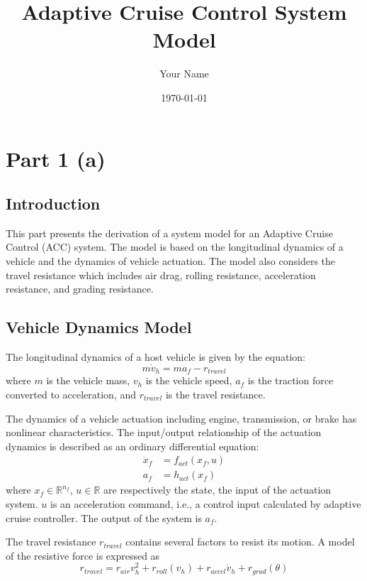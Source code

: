 \documentclass[12pt]{report}
\title{Adaptive Cruise Control System Model}
\author{Your Name}
\date{\today}
\begin{document}
\maketitle
\setcounter{tocdepth}{3}
\tableofcontents


\chapter{Part 1 (a)}
\section{Introduction}
This part presents the derivation of a system model for an Adaptive Cruise Control (ACC) system. The model is based on the longitudinal dynamics of a vehicle and the dynamics of vehicle actuation. The model also considers the travel resistance which includes air drag, rolling resistance, acceleration resistance, and grading resistance.

\section{Vehicle Dynamics Model}
The longitudinal dynamics of a host vehicle is given by the equation:
\begin{equation}
    m\dot{v}_h = m a_f - r_{travel}
\end{equation}
where \(m\) is the vehicle mass, \(v_h\) is the vehicle speed, \(a_f\) is the traction force converted to acceleration, and \(r_{travel}\) is the travel resistance.

The dynamics of a vehicle actuation including engine, transmission, or brake has nonlinear characteristics. The input/output relationship of the actuation dynamics is described as an ordinary differential equation:
\begin{align}
    \dot{x}_f & = f_{act}(x_f, u) \\
    a_f       & = h_{act}(x_f)
\end{align}
where \(x_f \in \mathbb{R}^{n_f}\), \(u \in \mathbb{R}\) are respectively the state, the input of the actuation system. \(u\) is an acceleration command, i.e., a control input calculated by adaptive cruise controller. The output of the system is \(a_f\).

The travel resistance \(r_{travel}\) contains several factors to resist its motion. A model of the resistive force is expressed as
\begin{equation}
    r_{travel} = r_{air} v_h^2 + r_{roll}(v_h) + r_{accel} \dot{v}_h + r_{grad}(\theta)
\end{equation}
\end{document}
